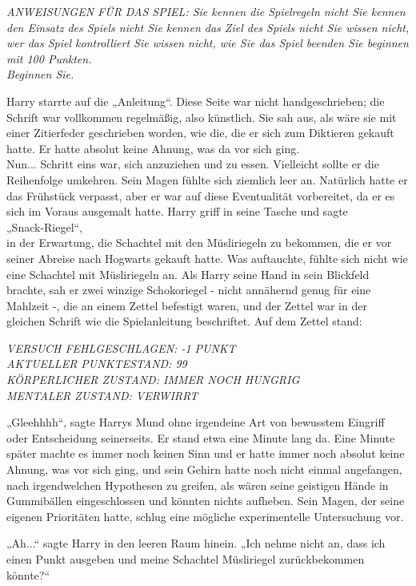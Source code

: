 {\emph{ANWEISUNGEN FÜR DAS SPIEL: Sie kennen die Spielregeln nicht Sie kennen den Einsatz des Spiels nicht Sie kennen das Ziel des Spiels nicht Sie wissen nicht, wer das Spiel kontrolliert Sie wissen nicht, wie Sie das Spiel beenden Sie beginnen mit 100 Punkten.}\\ \emph{Beginnen Sie.}

Harry starrte auf die „Anleitung“. Diese Seite war nicht handgeschrieben; die Schrift war vollkommen regelmäßig, also künstlich. Sie sah aus, als wäre sie mit einer Zitierfeder geschrieben worden, wie die, die er sich zum Diktieren gekauft hatte. Er hatte absolut keine Ahnung, was da vor sich ging.\\ Nun... Schritt eins war, sich anzuziehen und zu essen. Vielleicht sollte er die Reihenfolge umkehren. Sein Magen fühlte sich ziemlich leer an. Natürlich hatte er das Frühstück verpasst, aber er war auf diese Eventualität vorbereitet, da er es sich im Voraus ausgemalt hatte. Harry griff in seine Tasche und sagte\\ „Snack-Riegel“,\\ in der Erwartung, die Schachtel mit den Müsliriegeln zu bekommen, die er vor seiner Abreise nach Hogwarts gekauft hatte. Was auftauchte, fühlte sich nicht wie eine Schachtel mit Müsliriegeln an. Als Harry seine Hand in sein Blickfeld brachte, sah er zwei winzige Schokoriegel - nicht annähernd genug für eine Mahlzeit -, die an einem Zettel befestigt waren, und der Zettel war in der gleichen Schrift wie die Spielanleitung beschriftet. Auf dem Zettel stand:

\emph{VERSUCH FEHLGESCHLAGEN: -1 PUNKT}\\ \emph{AKTUELLER PUNKTESTAND: 99}\\ \emph{KÖRPERLICHER ZUSTAND: IMMER NOCH HUNGRIG}\\ \emph{MENTALER ZUSTAND: VERWIRRT}

„Gleehhhh“, sagte Harrys Mund ohne irgendeine Art von bewusstem Eingriff oder Entscheidung seinerseits. Er stand etwa eine Minute lang da. Eine Minute später machte es immer noch keinen Sinn und er hatte immer noch absolut keine Ahnung, was vor sich ging, und sein Gehirn hatte noch nicht einmal angefangen, nach irgendwelchen Hypothesen zu greifen, als wären seine geistigen Hände in Gummibällen eingeschlossen und könnten nichts aufheben. Sein Magen, der seine eigenen Prioritäten hatte, schlug eine mögliche experimentelle Untersuchung vor.

„Ah...“ sagte Harry in den leeren Raum hinein. „Ich nehme nicht an, dass ich einen Punkt ausgeben und meine Schachtel Müsliriegel zurückbekommen könnte?“

}
